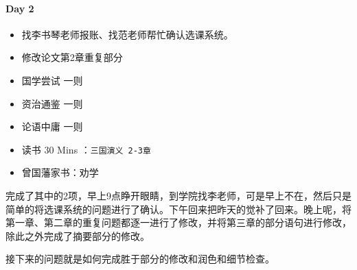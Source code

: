 \documentclass[UTF8,a4paper,8pt]{ctexart}
\begin{document}
 	 \paragraph{Day 2       \quad     }
	 	 \begin{itemize}[itemindent = 1em]
	 	 	\renewcommand\labelitemi{\makebox[0pt][l]{$\square$}\raisebox{.15ex}{\hspace{0.1em}$\checkmark$}}		
	 	 	
	 	 	\item 	 找李书琴老师报账、找范老师帮忙确认选课系统。
	 	 	\item    修改论文第2章重复部分
	 	 	
	 	 	
	 	 	\renewcommand\labelitemi{\makebox[0pt][l]{$\square$}\hspace{1em}}
	 	 	\item   国学尝试 一则
	 	 	\item 	资治通鉴 一则
	 	 	\item 	论语中庸 一则
	 	 	\item   读书  30 Mins	：\verb|三国演义 2-3章|
	 	 	\item   曾国藩家书：劝学
	 	 \end{itemize}
	 	 
	 	完成了其中的2项，早上9点睁开眼睛，到学院找李老师，可是早上不在，然后只是简单的将选课系统的问题进行了确认。下午回来把昨天的觉补了回来。晚上呢，将第一章、第二章的重复问题都逐一进行了修改，并将第三章的部分语句进行修改，除此之外完成了摘要部分的修改。
	 	
	 	接下来的问题就是如何完成胜于部分的修改和润色和细节检查。
	 	
	 	
\end{document}

